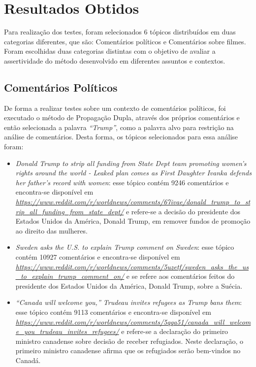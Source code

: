 \chapter{Resultados Obtidos}
\label{cap:impl}

Para realização dos testes, foram
selecionados 6 tópicos distribuídos em duas categorias diferentes, que são:
Comentários políticos e Comentários sobre filmes. Foram escolhidas duas
categorias distintas com o objetivo de avaliar a assertividade do método
desenvolvido em diferentes assuntos e contextos.

\section{Comentários Políticos}

De forma a realizar testes sobre um contexto de comentários políticos, foi
executado o método de Propagação Dupla, através dos próprios comentários e então
selecionada a palavra \textit{``Trump''}, como a palavra alvo para
restrição na análise de comentários. Desta forma, os tópicos selecionados para
essa análise foram:

\begin{itemize}
  \item
  \textit{Donald Trump to strip all funding from State Dept team promoting
  women's rights around the world - Leaked plan comes as First Daughter Ivanka
  defends her father's record with women}: esse tópico contém 9246
  comentários e encontra-se disponível em
  \textit{\url{https://www.reddit.com/r/worldnews/comments/67ivae/donald_trump_to_strip_all_funding_from_state_dept/}}
  e refere-se a decisão do presidente dos Estados Unidos da América, Donald
  Trump, em remover fundos de promoção ao direito das mulheres.  
  \item
  \textit{Sweden asks the U.S. to explain Trump comment on
  Sweden}: esse tópico contém 10927
  comentários e encontra-se disponível em
  \textit{\url{https://www.reddit.com/r/worldnews/comments/5uzetf/sweden_asks_the_us_to_explain_trump_comment_on/}}
  e se refere aos comentários feitos do presidente dos Estados Unidos da
  América, Donald Trump, sobre a Suécia.
  
  \item\textit{“Canada will welcome you,” Trudeau invites refugees as Trump bans
  them}: esse tópico contém 9113
  comentários e encontra-se disponível em
  \textit{\url{https://www.reddit.com/r/worldnews/comments/5qqa51/canada_will_welcome_you_trudeau_invites_refugees/}}
  e refere-se a declaração do primeiro ministro canadense sobre decisão de
  receber refugiados. Neste declaração, o primeiro ministro canadense afirma que
  os refugiados serão bem-vindos no Canadá.
\end{itemize}

